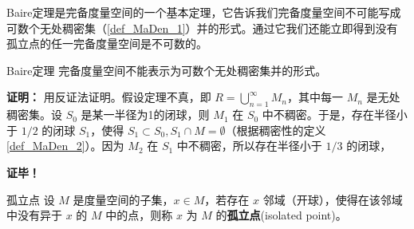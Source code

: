 
Baire定理是完备度量空间的一个基本定理，它告诉我们完备度量空间不可能写成可数个无处稠密集（\autoref{def_MaDen_1}）并的形式。通过它我们还能立即得到没有孤立点的任一完备度量空间是不可数的。

\begin{theorem}{Baire定理}
完备度量空间不能表示为可数个无处稠密集并的形式。
\end{theorem}
\textbf{证明：}
用反证法证明。假设定理不真，即 $R=\bigcup_{n=1}^\infty M_n$，其中每一 $M_n$ 是无处稠密集。设 $S_0$ 是某一半径为1的闭球，则 $M_1$ 在 $S_0$ 中不稠密。于是，存在半径小于 $1/2$ 的闭球 $S_1$，使得 $S_1\subset S_0,S_1\cap M=\emptyset$（根据稠密性的定义\autoref{def_MaDen_2}）。因为 $M_2$ 在 $S_1$ 中不稠密，所以存在半径小于 $1/3$ 的闭球， 

\textbf{证毕！}


\begin{definition}{孤立点}
设 $M$ 是度量空间的子集，$x\in M$，若存在 $x$ 邻域（开球），使得在该邻域中没有异于 $x$ 的 $M$ 中的点，则称 $x$ 为 $M$ 的\textbf{孤立点}(isolated point)。
\end{definition}





